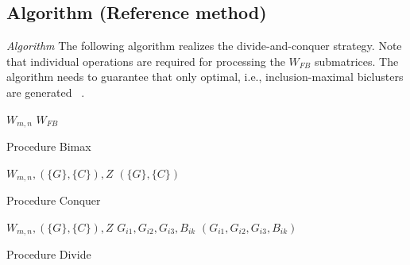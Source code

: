 \documentclass[a4paper,conference]{IEEEtran}
\begin{document}
\subsection{Algorithm (Reference method)}

\textit{Algorithm} The following algorithm realizes the divide-and-conquer strategy. Note that individual operations are required for processing the $W_{FB}$ submatrices. The algorithm needs to guarantee that only optimal, i.e., inclusion-maximal biclusters are generated ~\cite{prelic2006systematic}. 

\begin{algorithm}
\begin{algorithmic}[1]
\REQUIRE $W_{m,n}$
\ENSURE $W_{FB}$
\caption{Procedure Bimax}\label{alg:BIMAX}
\end{algorithmic}
\end{algorithm}

\begin{algorithm}
\begin{algorithmic}[1]
\REQUIRE $W_{m,n}, (\{G\}, \{C\}), Z$
\ENSURE $(\{G\}, \{C\})$
\ENDIF
{}
\ENDIF
{}
\ENDIF
{}
\caption{Procedure Conquer}\label{alg:Conquer}
\end{algorithmic}
\end{algorithm}

\begin{algorithm}
\begin{algorithmic}[1]
\REQUIRE $W_{m,n}, (\{G\}, \{C\}), Z$
\ENSURE $G_{i1},G_{i2},G_{i3}, B_{ik}$
\ELSE
{}
\ENDIF
{}
\ELSE
{}
\ENDIF
\ENDFOR
\RETURN $(G_{i1},G_{i2},G_{i3}, B_{ik})$
\caption{Procedure Divide}\label{alg:Divide}
\end{algorithmic}
\end{algorithm}
\end{document}
